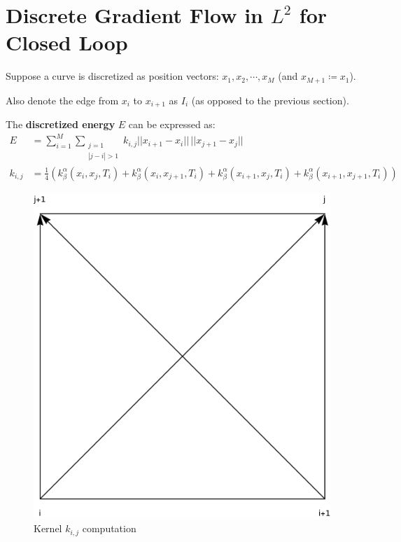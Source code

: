 \documentclass[a4paper, 11pt]{article}
\newcommand{\norm}[1]{||#1||}
\theoremstyle{definition}
\theoremstyle{remark}
\begin{document}
\section{Discrete Gradient Flow in $L^2$ for Closed Loop}
Suppose a curve is discretized as position vectors:
$x_1, x_2, \cdots, x_M$ (and $x_{M+1} \coloneqq x_1$).

Also denote the edge from $x_i$ to $x_{i+1}$ as $I_i$ (as opposed to the previous section).

The \textbf{discretized energy} $E$ can be expressed as:
\begin{align}
    E &= \sum_{i = 1}^{M} \sum_{\substack{j = 1 \\ |j-i| > 1}} k_{i,j} \norm{x_{i+1} - x_i} \, \norm{x_{j+1} - x_j} \\
    k_{i,j} &= \frac{1}{4} \left( 
        k_{\beta}^{\alpha} \left( x_i, x_j, T_i \right)
        + k_{\beta}^{\alpha} \left( x_i, x_{j+1}, T_i \right)
        + k_{\beta}^{\alpha} \left( x_{i+1}, x_j, T_i \right)
        + k_{\beta}^{\alpha} \left( x_{i+1}, x_{j+1}, T_i \right)
    \right)
\end{align}

\begin{figure}[h]
    \centering
    \includegraphics[scale=0.6]{kernel-2x2.png}
    \caption{Kernel $k_{i,j}$ computation}
\end{figure}
\end{document}
